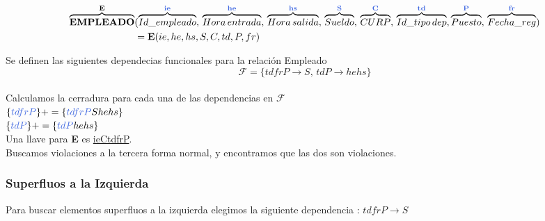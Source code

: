 \documentclass[10pt]{article}
\begin{document}
   \begin{align*}
   \overbrace{ \textbf{EMPLEADO}}^{\textbf{{E}}}&(\overbrace{ Id\_empleado}^{\textbf{\textcolor{RoyalBlue}{ie}}},\,\overbrace{Hora\, entrada}^{\textbf{\textcolor{RoyalBlue}{he}}},\,\overbrace{Hora\, salida}^{\textbf{\textcolor{RoyalBlue}{hs}}},\,\overbrace{Sueldo}^{\textbf{\textcolor{RoyalBlue}{S}}},\,\overbrace{CURP}^{\textbf{\textcolor{RoyalBlue}{C}}},\,\overbrace{Id\_tipo\, dep}^{\textbf{\textcolor{RoyalBlue}{td}}},\overbrace{Puesto}^{\textbf{\textcolor{RoyalBlue}{P}}},\,\overbrace{Fecha\_reg}^{\textbf{\textcolor{RoyalBlue}{fr}}})\\
   &= \textbf{E}(ie,he,hs,S,C,td,P,fr)
   \end{align*}
   
   Se definen las siguientes dependecias funcionales para la relación Empleado\\
   
   $$\mathcal{F}=\{ tdfrP \rightarrow S,\, tdP \rightarrow hehs\}$$\\
   
   Calculamos la cerradura para cada una de las dependencias en $\mathcal{F}$\\
   
   $\{\textcolor{RoyalBlue}{tdfrP}\}+= \{\textcolor{RoyalBlue}{tdfrP}Shehs\}$\\
   
   $\{\textcolor{RoyalBlue}{tdP}\}+= \{\textcolor{RoyalBlue}{tdP}hehs\}$\\
   
   Una llave para \textbf{E} es \underline{ieCtdfrP}.\\
   
   Buscamos violaciones a la tercera forma normal, y encontramos que las dos son violaciones.\\
   
   \subsubsection{Superfluos a la Izquierda}
   
   Para buscar elementos superfluos a la izquierda elegimos la siguiente dependencia : $tdfrP \rightarrow S$\\
   
\end{document}
